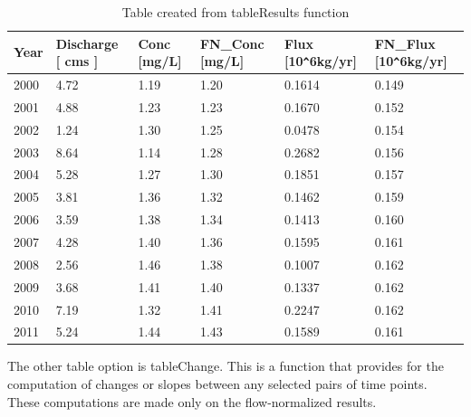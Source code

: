 \documentclass[a4paper,11pt]{article}
\begin{document}
\begin{table}[!ht]
\begin{center}
\caption{Table created from tableResults function}
\label{table:tableResults}
\begin{tabular}{llllll}
  \hline
Year & Discharge [   cms  ] & Conc [mg/L] & FN\_Conc [mg/L] & Flux [10\verb|^|6kg/yr] & FN\_Flux [10\verb|^|6kg/yr] \\ 
  \hline
   2000 &      4.72 &      1.19 &      1.20 &    0.1614 &     0.149 \\ 
     2001 &      4.88 &      1.23 &      1.23 &    0.1670 &     0.152 \\ 
     2002 &      1.24 &      1.30 &      1.25 &    0.0478 &     0.154 \\ 
     2003 &      8.64 &      1.14 &      1.28 &    0.2682 &     0.156 \\ 
     2004 &      5.28 &      1.27 &      1.30 &    0.1851 &     0.157 \\ 
     2005 &      3.81 &      1.36 &      1.32 &    0.1462 &     0.159 \\ 
     2006 &      3.59 &      1.38 &      1.34 &    0.1413 &     0.160 \\ 
     2007 &      4.28 &      1.40 &      1.36 &    0.1595 &     0.161 \\ 
     2008 &      2.56 &      1.46 &      1.38 &    0.1007 &     0.162 \\ 
     2009 &      3.68 &      1.41 &      1.40 &    0.1337 &     0.162 \\ 
     2010 &      7.19 &      1.32 &      1.41 &    0.2247 &     0.162 \\ 
     2011 &      5.24 &      1.44 &      1.43 &    0.1589 &     0.161 \\ 
   \hline
\end{tabular}
\end{center}
\end{table}


\FloatBarrier

The other table option is tableChange. This is a function that provides for the computation of changes or slopes between any selected pairs of time points.  These computations are made only on the flow-normalized results.
\end{document}
